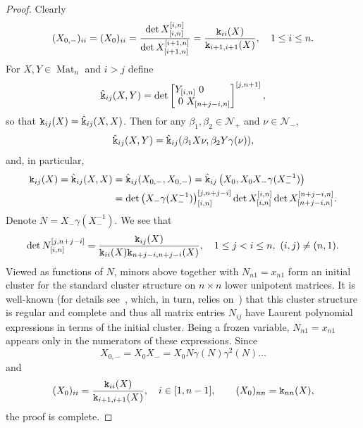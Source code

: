 \documentclass{amsart}
\theoremstyle{definition}
\theoremstyle{remark}
\numberwithin{equation}{section}
\numberwithin{theorem}{section}
\def\N{\mathcal N}
\def\ek{{\tt k}}
\def\Mat{\operatorname{Mat}}
\begin{document}
\begin{proof}
Clearly 
\[
(X_{0,-})_{ii} =(X_{0})_{ii} = \frac{\det X_{[i,n]}^{[i,n]}}{\det X_{[i+1,n]}^{[i+1,n]}} =\frac{\ek_{ii}(X)}{\ek_{i+1,i+1}(X)},\quad 1\le i\le n.
\]
For $X,Y\in \Mat_n$ and $i>j$ define
\begin{equation}
\label{hatekfunctions}
\hat\ek_{ij}(X,Y)= \det
\begin{bmatrix*}[l]
Y_{[i,n]}\ 0& \\
\ 0\ X_{[n+j-i,n]}\hspace{-1em}
\end{bmatrix*}^{[j,n+1]}, 
\end{equation}
so that $\ek_{ij}(X)=\hat\ek_{ij}(X,X)$. Then for any $\beta_1,\beta_2\in\N_+$ and $\nu\in\N_-$,
\[
\hat\ek_{ij}(X,Y)= \hat\ek_{ij}(\beta_1 X\nu,\beta_2Y\gamma(\nu)), %
\]
and, in particular,
\begin{align*}
\ek_{ij}(X)=\hat\ek_{ij}(X,X)&= \hat\ek_{ij}(X_{0,-},X_{0,-}) =\hat\ek_{ij}\left(X_{0},X_{0} X_-\gamma(X_-^{-1})\right)\\
&=\det \left(X_-\gamma(X_-^{-1})\right)_{[i,n]}^{[j,n+j-i]} \det X_{[i,n]}^{[i,n]}\det X_{[n+j-i,n]}^{[n+j-i,n]}.
\end{align*}
Denote $N=X_-\gamma(X_-^{-1})$. We see that
\begin{equation}
\label{eq:Nminors}
\det N_{[i,n]}^{[j,n+j-i]}=\frac{\ek_{ij}(X)}{\ek_{ii}(X)\ek_{n+j-i,n+j-i}(X)}, \quad 1\leq j < i \leq n,\ (i,j)\neq (n,1).
\end{equation}
Viewed as functions of $N$, minors above together with $N_{n1}=x_{n1}$ form an initial cluster for the standard cluster structure on $n\times n$ lower unipotent matrices.
It is well-known (for details see~\cite[Remark~3.4]{GSVdouble}, which, in turn, relies on~\cite{BFZ}) that  this cluster structure is regular and complete and thus all matrix entries $N_{ij}$ have Laurent polynomial expressions in terms of the initial cluster. Being a frozen variable, $N_{n1}=x_{n1}$ appears only in the numerators of these expressions. Since 
\[
X_{0,-}=X_0 X_- = X_0N\gamma(N)\gamma^2(N)\dots
\] 
and
\begin{equation}\label{X0viak}
(X_0)_{ii}=\frac{\ek_{ii}(X)}{\ek_{i+1,i+1}(X)},\quad i\in[1,n-1],\qquad (X_0)_{nn}=\ek_{nn}(X),
\end{equation}
the proof is complete.
\end{proof}
\end{document}
